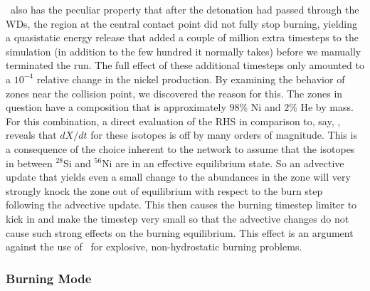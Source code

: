 \documentclass[12pt]{article}
\begin{document}
\isoseven\ also has the peculiar property that after the detonation had passed through the WDs,
the region at the central contact point did not fully stop burning, yielding a quasistatic energy
release that added a couple of million extra timesteps to the simulation (in addition to the few
hundred it normally takes) before we manually terminated the run. The full effect of these additional
timesteps only amounted to a $10^{-4}$ relative change in the nickel production. By examining the behavior
of zones near the collision point, we discovered the reason for this. The zones in question have a composition that
is approximately $98\%$ Ni and $2\%$ He by mass. For this combination, a direct evaluation of the RHS in
comparison to, say, \aproxthirteen, reveals that $dX/dt$ for these isotopes is off by many orders of magnitude.
This is a consequence of the choice inherent to the network to assume that the isotopes in between $^{28}$Si
and $^{56}$Ni are in an effective equilibrium state. So an advective update that yields even a small change
to the abundances in the zone will very strongly knock the zone out of equilibrium with respect to the burn
step following the advective update. This then causes the burning timestep limiter to kick in and make the
timestep very small so that the advective changes do not cause such strong effects on the burning equilibrium.
This effect is an argument against the use of \isoseven\ for explosive, non-hydrostatic burning problems.

\subsubsection{Burning Mode}
\label{sec:collision_parameters:burningmode}
\end{document}
